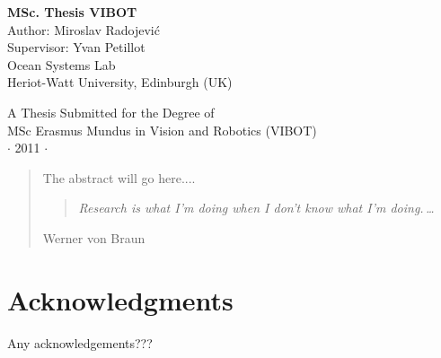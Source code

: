 
\newpage
\thispagestyle{empty}


\vspace*{2cm}
\begin{center}
{\Large\bf MSc. Thesis VIBOT\\} \vspace{2cm} {\large
Author: Miroslav Radojevi\'c \\
Supervisor: Yvan Petillot    \\
\vspace{2cm}
Ocean Systems Lab \\
Heriot-Watt University, Edinburgh (UK)   
}

\end{center}

\vspace{7cm}
\begin{center}
{\large A Thesis Submitted for the Degree of \\MSc Erasmus Mundus
in Vision and Robotics (VIBOT) \\\vspace{0.3cm} $\cdot$ 2011
$\cdot$}
\end{center}
\singlespacing


\begin{abstract}
The abstract will go here....

\vspace*{5cm}



\begin{center}
\begin{quote}
\it Research is what I'm doing when I don't know what I'm
doing.\,\ldots
\end{quote}
\end{center}
\hfill{\small Werner von Braun}

\end{abstract}

\doublespacing

\setcounter{page}{1} \pagestyle{plain}


\tableofcontents

\listoffigures
\listoftables

\chapter*{Acknowledgments}
         {\protect{}}

Any acknowledgements???

\pagestyle{fancy}

